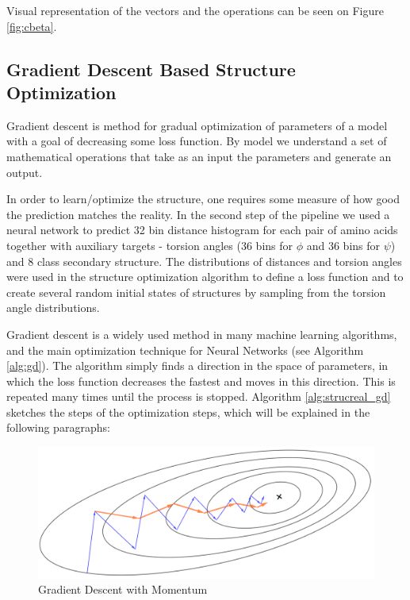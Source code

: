 Visual representation of the vectors and the operations can be seen on Figure \ref{fig:cbeta}.

\subsection{Gradient Descent Based Structure Optimization}

Gradient descent is method for gradual optimization of parameters of a model with a goal of decreasing some loss function. By model we understand a set of mathematical operations that take as an input the parameters and generate an output. 

In order to learn/optimize the structure, one requires some measure of how good the prediction matches the reality. In the second step of the pipeline we used a neural network to predict 32 bin distance histogram for each pair of amino acids together with auxiliary targets - torsion angles (36 bins for $\phi$ and 36 bins for $\psi$) and 8 class secondary structure. The distributions of distances and torsion angles were used in the structure optimization algorithm to define a loss function and to create several random initial states of structures by sampling from the torsion angle distributions.

Gradient descent is a widely used method in many machine learning algorithms, and the main optimization technique for Neural Networks (see Algorithm \ref{alg:gd}). The algorithm simply finds a direction in the space of parameters, in which the loss function decreases the fastest and moves in this direction. This is repeated many times until the process is stopped. Algorithm \ref{alg:strucreal_gd} sketches the steps of the optimization steps, which will be explained in the following paragraphs:

\begin{figure}
    \centering
    \includegraphics[width=\linewidth]{imgs_tomas/momentum.png}
    \caption{Gradient Descent with Momentum}
    \label{fig:momentum}
\end{figure}

